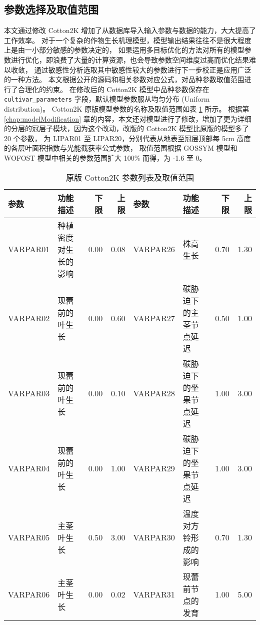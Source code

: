 \begin{spacing}{}
    \section{参数选择及取值范围}
    本文通过修改 Cotton2K 增加了从数据库导入输入参数与数据的能力，大大提高了工作效率。%
    对于一个复杂的作物生长机理模型，模型输出结果往往不是很大程度上是由一小部分敏感的参数决定的，%
    如果运用多目标优化的方法对所有的模型参数进行优化，即浪费了大量的计算资源，也会导致参数空间维度过高而优化结果难以收敛，%
    通过敏感性分析选取其中敏感性较大的参数进行下一步校正是应用广泛的一种方法。%
    本文根据公开的源码和相关参数对应公式，对品种参数取值范围进行了合理化的约束。%
    在修改后的 Cotton2K 模型中品种参数保存在 \texttt{cultivar\_parameters} 字段，默认模型参数服从均匀分布 (Uniform distribution)。%
    Cotton2K 原版模型参数的名称及取值范围如表 \ref{tab:saParameters} 所示。%
    根据第 \ref{chap:modelModification} 章的内容，本文还对模型进行了修改，增加了更为详细的分层的冠层子模块，因为这个改动，改版的 Cotton2K 模型比原版的模型多了 20 个参数，%
    为 LIPAR01 至 LIPAR20，分别代表从地表至冠层顶部每 5cm 高度的各层叶面积指数与光能截获率公式参数，%
    取值范围根据 GOSSYM 模型和 WOFOST 模型中相关的参数范围扩大 100\% 而得，为 -1.6 至 0。
    \begin{table}
        \caption{原版 Cotton2K 参数列表及取值范围}\label{tab:saParameters}
        \tiny
        \centering
        \begin{tabular}{llrr|llrr}
            \toprule
            参数     & 功能描述             & 下限  & 上限  & 参数     & 功能描述                   & 下限   & 上限   \\
            \midrule
            VARPAR01 & 种植密度对生长的影响 & 0.00  & 0.08  & VARPAR26 & 株高生长                   & 0.70   & 1.30   \\
            VARPAR02 & 现蕾前的叶生长       & 0.00  & 0.60  & VARPAR27 & 碳胁迫下的主茎节点延迟     & 0.50   & 1.00   \\
            VARPAR03 & 现蕾前的叶生长       & 0.00  & 0.10  & VARPAR28 & 碳胁迫下的坐果节点延迟     & 1.00   & 3.00   \\
            VARPAR04 & 现蕾前的叶生长       & 0.00  & 1.00  & VARPAR29 & 碳胁迫下的坐果节点延迟     & 1.00   & 3.00   \\
            VARPAR05 & 主茎叶生长           & 0.50  & 3.00  & VARPAR30 & 温度对方铃形成的影响       & 0.70   & 1.30   \\
            VARPAR06 & 主茎叶生长           & 0.00  & 0.02  & VARPAR31 & 现蕾前节点的发育           & 1.00   & 5.00   \\

\end{tabular}
\end{table}
\end{spacing}
